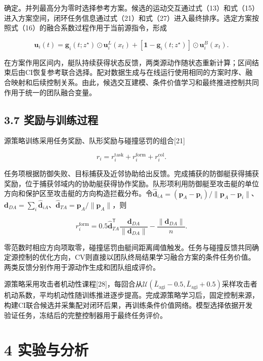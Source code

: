\documentclass[UTF8,10.5pt,a4paper,fontset=none]{ctexart}
\begin{document}
确定。并列最高分为零时选择参考方案。候选的运动交互通过式（13）和式（15）进入方案空间，闭环任务信息通过式（21）和式（27）进入最终排序。选定方案按照式（16）的融合系数过程作用于当前源指令，形成

\[
\boldsymbol u_i(t)=
\boldsymbol g_i(t;z^\star)\odot\boldsymbol u_i^L(x_t)
+[\boldsymbol1-\boldsymbol g_i(t;z^\star)]\odot\boldsymbol u_i^B(x_t).
\tag{28}
\]

在方案作用区间内，艇队持续获得状态反馈，两类源动作随状态重新计算；区间结束后由CI恢复参考联合选择。配对数据生成与在线运行使用相同的方案时序、融合映射和后续控制关系。由此，候选交互建模、条件价值学习和最终推进控制共同作用于统一的团队融合变量。

\subsection{3.7
奖励与训练过程}\label{ux5956ux52b1ux4e0eux8badux7ec3ux8fc7ux7a0b}

源策略训练采用任务奖励、队形奖励与碰撞惩罚的组合{[}21{]}

\[
r_i=r_i^{\mathrm{task}}+r_i^{\mathrm{form}}+r_i^{\mathrm{col}}.
\tag{29}
\]

任务项根据防御失败、目标捕获及近邻协助给出反馈。完成捕获的防御艇获得捕获奖励，位于捕获邻域内的协助艇获得协作奖励。队形项利用防御艇至攻击艇的单位方向和保护区至攻击艇的方向构造拦截分布。令\(\widehat{\boldsymbol d}_{iA}=(\boldsymbol p_A-\boldsymbol p_i)/\|\boldsymbol p_A-\boldsymbol p_i\|\)、\(\boldsymbol d_{DA}=\sum_i\widehat{\boldsymbol d}_{iA}\)、\(\widehat{\boldsymbol d}_{TA}=\boldsymbol p_A/\|\boldsymbol p_A\|\)，则

\[
r_i^{\mathrm{form}}=
0.5\widehat{\boldsymbol d}_{TA}^{\mathsf T}
\frac{\boldsymbol d_{DA}}{\|\boldsymbol d_{DA}\|}
-\frac{\|\boldsymbol d_{DA}\|}{n}.
\tag{30}
\]

零范数时相应方向项取零，碰撞惩罚由艇间距离阈值触发。任务与碰撞反馈共同确定源控制的优化方向，CV则直接以团队终局结果学习融合方案的条件任务价值。两类反馈分别作用于源动作生成和团队组成评价。

源策略采用攻击者机动性课程{[}28{]}，每回合从\(\mathcal U(\bar L_{\mathrm{agi}}-0.5,\bar L_{\mathrm{agi}}+0.5)\)采样攻击者机动系数，平均机动性随训练推进逐步提高。完成源策略学习后，固定控制来源，构建CI联合候选并采集配对闭环后果，再训练条件价值网络。模型选择依据开发验证任务，冻结后的完整控制器用于最终任务评价。

\section{4 实验与分析}\label{ux5b9eux9a8cux4e0eux5206ux6790}
\end{document}
